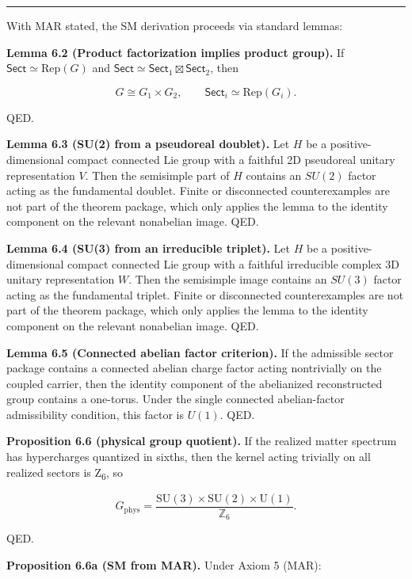 \begin{center}\rule{0.5\linewidth}{0.5pt}\end{center}

With MAR stated, the SM derivation proceeds via standard lemmas:

\textbf{Lemma 6.2 (Product factorization implies product group).} If \(\mathsf{Sect} \simeq \mathrm{Rep}(G)\) and \(\mathsf{Sect} \simeq \mathsf{Sect}_1 \boxtimes \mathsf{Sect}_2\), then

\[
G \cong G_1 \times G_2,
\qquad
\mathsf{Sect}_i \simeq \mathrm{Rep}(G_i).
\]

QED.

\textbf{Lemma 6.3 (SU(2) from a pseudoreal doublet).} Let \(H\) be a positive-dimensional compact connected Lie group with a faithful 2D pseudoreal unitary representation \(V\). Then the semisimple part of \(H\) contains an \(SU(2)\) factor acting as the fundamental doublet. Finite or disconnected counterexamples are not part of the theorem package, which only applies the lemma to the identity component on the relevant nonabelian image. QED.

\textbf{Lemma 6.4 (SU(3) from an irreducible triplet).} Let \(H\) be a positive-dimensional compact connected Lie group with a faithful irreducible complex 3D unitary representation \(W\). Then the semisimple image contains an \(SU(3)\) factor acting as the fundamental triplet. Finite or disconnected counterexamples are not part of the theorem package, which only applies the lemma to the identity component on the relevant nonabelian image. QED.

\textbf{Lemma 6.5 (Connected abelian factor criterion).} If the admissible sector package contains a connected abelian charge factor acting nontrivially on the coupled carrier, then the identity component of the abelianized reconstructed group contains a one-torus. Under the single connected abelian-factor admissibility condition, this factor is \(U(1)\). QED.

\textbf{Proposition 6.6 (physical group quotient).} If the realized matter spectrum has hypercharges quantized in sixths, then the kernel acting trivially on all realized sectors is Z\textsubscript{6}, so

\[
G_{\mathrm{phys}} = \frac{\mathrm{SU}(3)\times \mathrm{SU}(2)\times \mathrm{U}(1)}{\mathbb Z_6}.
\]

QED.

\textbf{Proposition 6.6a (SM from MAR).} Under Axiom 5 (MAR):

